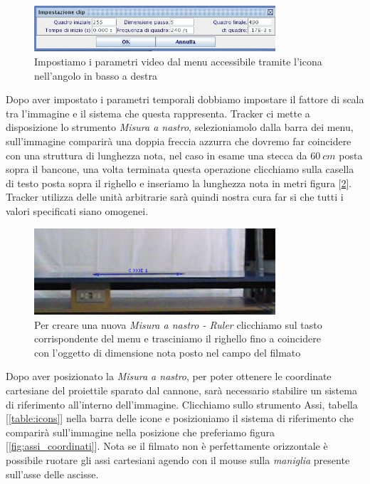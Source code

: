 \documentclass[a4paper,10pt,oneside]{article}
\begin{document}
\begin{figure}[H]
 \centering
 \includegraphics[width=0.8\textwidth]{./immagini/tracker_parametri_video.png}
 \caption{Impostiamo i parametri video dal menu accessibile tramite l'icona nell'angolo in basso a destra}
 \label{fig:parametri_video}
\end{figure}

Dopo aver impostato i parametri temporali dobbiamo impostare il fattore di scala tra l'immagine e il sistema che questa rappresenta. Tracker ci mette a disposizione lo strumento \textsl{Misura a nastro}, selezioniamolo dalla barra dei menu, sull'immagine comparirà una doppia freccia azzurra che dovremo far coincidere con una struttura di lunghezza nota, nel caso in esame una stecca da $60\ cm$ posta sopra il bancone, una volta terminata questa operazione clicchiamo sulla casella di testo posta sopra il righello e inseriamo la lunghezza nota in metri figura [\ref{fig:righello_dimensione}]. Tracker utilizza delle unità arbitrarie sarà quindi nostra cura far si che tutti i valori specificati siano omogenei.

\begin{figure}[H]
 \centering
 \includegraphics[width=0.8\textwidth]{./immagini/tracker_righello_dimensione.png}
 \caption{Per creare una nuova \emph{Misura a nastro - Ruler} clicchiamo sul tasto corrispondente del menu e trasciniamo il righello fino a coincidere con l'oggetto di dimensione nota posto nel campo del filmato}
 \label{fig:righello_dimensione}
\end{figure}

Dopo aver posizionato  la \textsl{Misura a nastro}, per poter ottenere le coordinate cartesiane del proiettile sparato dal cannone, sarà necessario stabilire un sistema di riferimento all'interno dell'immagine. Clicchiamo sullo strumento Assi, tabella [\ref{table:icons}] nella barra delle icone e posizioniamo il sistema di riferimento che comparirà sull'immagine nella posizione che preferiamo figura [\ref{fig:assi_coordinati}]. Nota se il filmato non è perfettamente orizzontale è possibile ruotare gli assi cartesiani agendo con il mouse sulla \emph{maniglia} presente sull'asse delle ascisse.
\end{document}
